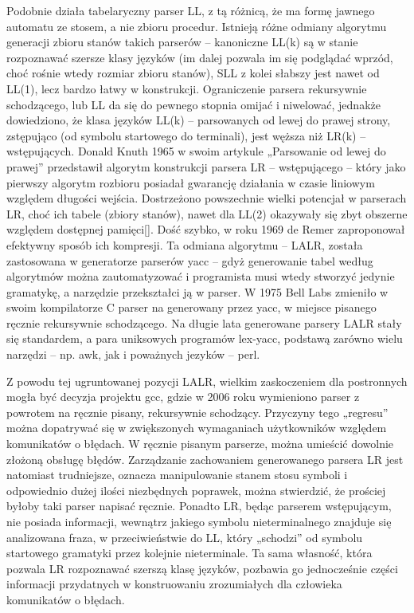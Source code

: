 Podobnie działa tabelaryczny parser LL, z tą różnicą, że ma formę jawnego automatu ze stosem, a nie zbioru procedur. Istnieją różne odmiany algorytmu generacji zbioru stanów takich parserów – kanoniczne LL(k) są w stanie rozpoznawać szersze klasy języków (im dalej pozwala im się podglądać wprzód, choć rośnie wtedy rozmiar zbioru stanów), SLL z kolei słabszy jest nawet od LL(1), lecz bardzo łatwy w konstrukcji.
Ograniczenie parsera rekursywnie schodzącego, lub LL da się do pewnego stopnia omijać i niwelować, jednakże dowiedziono, że klasa języków LL(k) – parsowanych od lewej do prawej strony, zstępująco (od symbolu startowego do terminali), jest węższa niż LR(k) – wstępujących.
Donald Knuth 1965 w swoim artykule „Parsowanie od lewej do prawej”\cite{TRANSLATION_FROM_LEFT_TO_RIGHT} przedstawił algorytm konstrukcji parsera LR – wstępującego – który jako pierwszy algorytm rozbioru posiadał gwarancję działania w czasie liniowym względem długości wejścia. Dostrzeżono powszechnie wielki potencjał w parserach LR,  choć ich tabele (zbiory stanów), nawet dla LL(2) okazywały się zbyt obszerne względem dostępnej pamięci[]. Dość szybko, w roku 1969 de Remer zaproponował efektywny sposób ich kompresji\cite{LALR}. Ta odmiana algorytmu – LALR, została zastosowana w generatorze parserów yacc – gdyż generowanie tabel według algorytmów można zautomatyzować i programista musi wtedy stworzyć jedynie gramatykę, a narzędzie przekształci ją w parser. W 1975 Bell Labs zmieniło w swoim kompilatorze C parser na generowany przez yacc, w miejsce pisanego ręcznie rekursywnie schodzącego. Na długie lata generowane parsery LALR stały się standardem, a para uniksowych programów lex-yacc, podstawą zarówno wielu narzędzi – np. awk, jak i poważnych jezyków – perl.\cite{parsing_timeline_kegler}

Z powodu tej ugruntowanej pozycji LALR, wielkim zaskoczeniem dla postronnych mogła być decyzja projektu gcc, gdzie w 2006 roku wymieniono parser z powrotem na ręcznie pisany, rekursywnie schodzący.\cite{gcc_2006_release_note} Przyczyny tego „regresu” można dopatrywać się w zwiększonych wymaganiach użytkowników względem komunikatów o błędach. W ręcznie pisanym parserze, można umieścić dowolnie złożoną obsługę błędów. Zarządzanie zachowaniem generowanego parsera LR jest natomiast trudniejsze, oznacza manipulowanie stanem stosu symboli i odpowiednio dużej ilości niezbędnych poprawek, można stwierdzić, że prościej byłoby taki parser napisać ręcznie. Ponadto LR, będąc parserem wstępującym, nie posiada informacji, wewnątrz jakiego symbolu nieterminalnego znajduje się analizowana fraza, w przeciwieństwie do LL, który „schodzi” od symbolu startowego gramatyki przez kolejnie nieterminale. Ta sama własność, która pozwala LR rozpoznawać szerszą klasę języków, pozbawia go jednocześnie części informacji przydatnych w konstruowaniu zrozumiałych dla człowieka komunikatów o błędach.\cite{parsing_timeline_kegler}%

